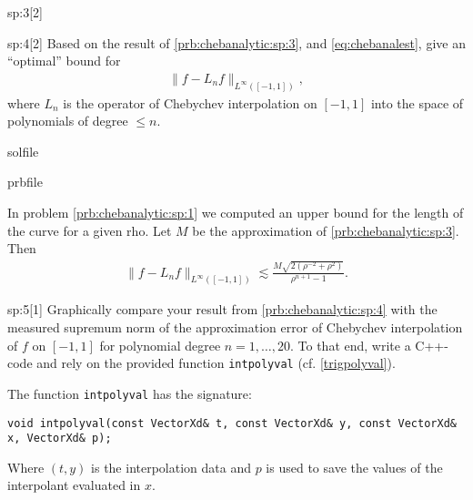 \begin{samproblem}
\begin{subproblem}{sp:3}[2]
\end{subproblem}


\begin{subproblem}{sp:4}[2]
  Based on the result of \ref{prb:chebanalytic:sp:3}, and  \cref{eq:chebanalest}, give an ``optimal'' bound for
  \begin{align*}
    \lVert f - L_n f \rVert_{L^\infty([-1,1])},
  \end{align*}
  where $L_n$ is the operator of Chebychev interpolation on $[-1,1]$ into the space of polynomials of degree $\leq n$.

  \begin{samwriteprbpart}{solfile}
    \begin{writeverbatim}{prbfile}
      \begin{samsolution}
        In problem \ref{prb:chebanalytic:sp:1} we computed an upper bound for the length of the curve for a given rho.
        Let $M$ be the approximation of \ref{prb:chebanalytic:sp:3}. Then
        \begin{align*}
          \lVert f - L_n f \rVert_{L^\infty([-1,1])} \lesssim \frac{M \sqrt{2 (\rho^{-2} + \rho^{2})}}{\rho^{n+1} - 1}.
        \end{align*}
     \end{samsolution}
    \end{writeverbatim}
  \end{samwriteprbpart}
\end{subproblem}


\begin{subproblem}{sp:5}[1]
  Graphically compare your result from \ref{prb:chebanalytic:sp:4} with the measured supremum norm of the approximation error of Chebychev interpolation 
  of $f$ on $[-1,1]$ for polynomial degree $n = 1,\dots,20$. To that end, write a C++-code and rely on the provided function 
  \verb|intpolyval| (cf. \cref{trigpolyval}).

  \begin{samhint}
    The function \texttt{intpolyval} has the signature:
    \begin{lstlisting}[style=cpp]
void intpolyval(const VectorXd& t, const VectorXd& y, const VectorXd& x, VectorXd& p);
    \end{lstlisting}
    Where $(t,y)$ is the interpolation data and $p$ is used to save the values of the interpolant evaluated in $x$.
  \end{samhint}


\end{subproblem}
\end{samproblem}
